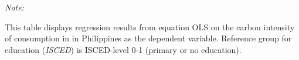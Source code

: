 \begin{table}[htbp!]
\begin{adjustbox}{width = 1\textwidth, max height = 0.95\textheight, center}
\begin{threeparttable}[b]
         \begin{tablenotes}\item \medskip \textit{Note:}
            \item This table displays regression results from equation OLS on the carbon intensity of consumption in  in Philippines as the dependent variable. Reference group for education (\textit{ISCED}) is ISCED-level 0-1 (primary or no education).
         \end{tablenotes}
      \end{threeparttable}
   \end{adjustbox}
\end{table}


